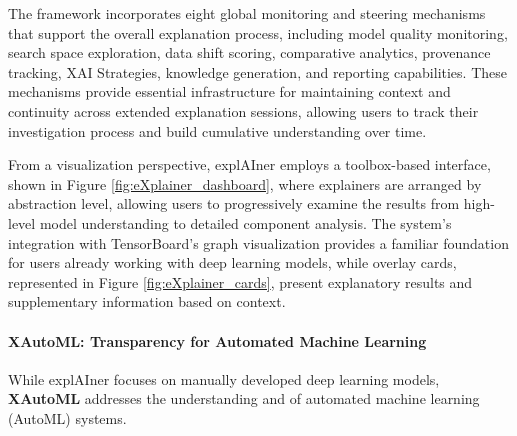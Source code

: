 The framework incorporates eight global monitoring and steering mechanisms that support the overall explanation process, including model quality monitoring, search space exploration, data shift scoring, comparative analytics, provenance tracking, XAI Strategies, knowledge generation, and reporting capabilities. These mechanisms provide essential infrastructure for maintaining context and continuity across extended explanation sessions, allowing users to track their investigation process and build cumulative understanding over time.

From a visualization perspective, explAIner employs a toolbox-based interface, shown in Figure \ref{fig:eXplainer_dashboard}, where explainers are arranged by abstraction level, allowing users to progressively examine the results from high-level model understanding to detailed component analysis. The system's integration with TensorBoard's graph visualization provides a familiar foundation for users already working with deep learning models, while overlay cards, represented in Figure \ref{fig:eXplainer_cards}, present explanatory results and supplementary information based on context.

\paragraph{XAutoML: Transparency for Automated Machine Learning}

While explAIner focuses on manually developed deep learning models, \textbf{XAutoML} \cite{Z_ller_2023} addresses the understanding and of automated machine learning (AutoML) systems. 

